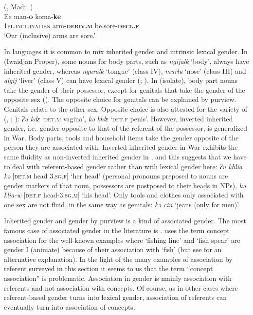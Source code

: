\documentclass[output=collectionpaper]{langsci/langscibook}
\begin{document}
\ea\label{ex:WDG:10}
 (, Madi; \citealt[490]{Dixon2000})\\
\gll Ee 	man-\textbf{o} 	koma-\textbf{ke}\\
1\textsc{pl.incl.inalien} 	arm-\textbf{\textsc{deriv.m}} 	be.sore-\textbf{\textsc{decl.f}}\\
\glt `Our (inclusive) arms are sore.'\\
\z

In  languages it is common to mix inherited gender and intrinsic lexical gender. In  (Iwaidjan Proper), some nouns for body parts, such as  \textit{ngijalk} `body', always have inherited gender, whereas \textit{ngaralk} `tongue' (class IV), \textit{murlu} `nose' (class III) and \textit{algij} `liver' (class V) can have lexical gender (\citealt{Capell1970}; \citealt[5]{Evans1994}). In  (isolate), body part nouns take the gender of their possessor, except for genitals that take the gender of the opposite sex (\citealt[2]{Evans1994}). The opposite choice for genitals can be explained by purview. Genitals relate to the other sex. Opposite choice is also attested for the  variety of  (, ; \citealt{Weidert1975}): \textit{ʔu kdɛ} `\textsc{det.m} vagina', \textit{kə khlɛ} `\textsc{det.f} penis'. However, inverted inherited gender, i.e.\ gender opposite to that of the referent of the possessor, is generalized in  War. Body parts, tools and household items take the gender opposite of the person they are associated with. Inverted inherited gender in  War exhibits the same fluidity as non-inverted inherited gender in , and this suggests that we have to deal with referent-based gender rather than with lexical gender here: \textit{ʔu khlia kə} [\textsc{det.m} head 3.\textsc{sg.f}] `her head' (personal pronouns preposed to nouns are gender markers of that noun, possessors are postposed to their heads in NPs), \textit{kə klia-w} [\textsc{det.f} head-3.\textsc{sg.m}] `his head'. Only tools and clothes only associated with one sex are not fluid, in the same way as genitals: \textit{kə cin} `jeans (only for men)'.

Inherited gender and gender by purview is a kind of associated gender. The most famous case of associated gender in the literature is . \cite[16]{Corbett1991} uses the term concept association for the well-known  examples where `fishing line' and `fish spear' are gender I (animate) because of their association with `fish' (but see \citealt{Plaster2007} for an alternative explanation). In the light of the many examples of association by referent surveyed in this section it seems to us that the term ``concept association'' is problematic. Association in gender is mainly association with referents and not association with concepts. Of course, as in other cases where referent-based gender turns into lexical gender, association of referents can eventually turn into association of concepts.
\end{document}
